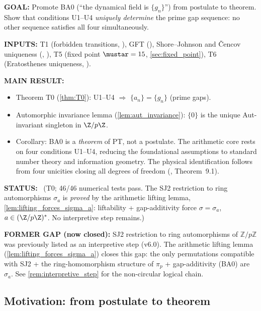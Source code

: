 \documentclass[12pt,a4paper]{article}
\begin{document}
\begin{statusbox}
\textbf{GOAL:}
  Promote BA0 (``the dynamical field is $\{g_n\}$'') from postulate to
  theorem. Show that conditions U1--U4 \emph{uniquely determine} the
  prime gap sequence: no other sequence satisfies all four simultaneously.

\textbf{INPUTS:}
  T1 (forbidden transitions, \cite{companion_M1}), GFT (\cite{companion_M1}), Shore--Johnson and
  \v{C}encov uniqueness (\cite{companion_M1}, \cite{companion_M2}), T5 (fixed point $\mustar = 15$,
  \cref{sec:fixed_point}), T6 (Eratosthenes uniqueness, \cite{companion_M1}).

\textbf{MAIN RESULT:}
  \begin{itemize}[nosep]
  \item Theorem T0 (\cref{thm:T0}): U1--U4 $\Rightarrow$ $\{a_n\} = \{g_n\}$
    (prime gaps).
  \item Automorphic invariance lemma (\cref{lem:aut_invariance}):
    $\{0\}$ is the unique Aut-invariant singleton in $\Z/p\Z$.
  \item Corollary: BA0 is a \emph{theorem} of PT, not a postulate.
    The arithmetic core rests on four conditions U1--U4, reducing
    the foundational assumptions to standard number theory and
    information geometry.  The physical identification follows from
    four unicities closing all degrees of freedom
    (\cite{companion_M5}, Theorem~9.1).
  \end{itemize}

\textbf{STATUS:}
  \THMTAG~(T0; 46/46 numerical tests pass.  The SJ2 restriction to
  ring automorphisms $\sigma_a$ is \emph{proved} by the arithmetic
  lifting lemma, \cref{lem:lifting_forces_sigma_a}: liftability +
  gap-additivity force $\sigma = \sigma_a$, $a \in (\Z/p\Z)^*$.
  No interpretive step remains.)

\textbf{FORMER GAP (now closed):}
  SJ2 restriction to ring automorphisms of $\mathbb{Z}/p\mathbb{Z}$
  was previously listed as an interpretive step (v6.0).  The arithmetic
  lifting lemma (\cref{lem:lifting_forces_sigma_a}) closes this gap:
  the only permutations compatible with SJ2 + the ring-homomorphism
  structure of $\pi_p$ + gap-additivity (BA0) are $\sigma_a$.
  See \cref{rem:interpretive_step} for the non-circular logical chain.
\end{statusbox}

\subsection{Motivation: from postulate to theorem}
\label{sec:ch25_motivation}
\end{document}
